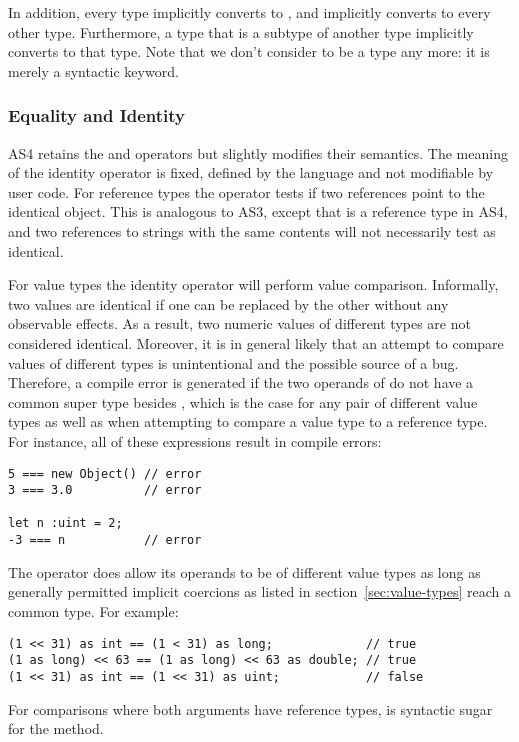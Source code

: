 In addition, every type implicitly converts to \code{*}, and \code{*} implicitly
converts to every other type. Furthermore, a type that is a
subtype of another type implicitly
converts to that type.
Note that we don't consider  to be a type any more: it is merely a
syntactic keyword.


\subsubsection{Equality and Identity}
AS4 retains the \code{==} and \code{===} operators but slightly
modifies their semantics. The meaning of the identity operator
\code{===} is fixed, defined by the language and not modifiable by
user code. For reference types the \code{===} operator tests if two
references point to the identical object. This is analogous to AS3,
except that  is a reference type in AS4, and two
references to strings with the same contents will not
necessarily test as identical.

For value types the identity operator will perform value comparison. Informally,
two values are identical if one can be replaced by the other without any
observable effects. As a result, two numeric values of different types are not
considered identical. Moreover, it is in general likely that an attempt to
compare values of different types is unintentional and the possible source of a
bug. Therefore, a compile error is generated if the two operands of \code{===}
do not have a common super type besides \code{*}, which is the case for any pair
of different value types as well as when attempting to compare a value type to a reference type. For
instance, all of these expressions result in compile errors:

\begin{verbatim}
5 === new Object() // error
3 === 3.0          // error

let n :uint = 2;
-3 === n           // error
\end{verbatim}

The \code{==} operator does allow its operands to be of different value types as
long as generally permitted implicit coercions as listed in section~\ref{sec:value-types}
reach a common type. For example:
\begin{verbatim}
(1 << 31) as int == (1 < 31) as long;             // true
(1 as long) << 63 == (1 as long) << 63 as double; // true
(1 << 31) as int == (1 << 31) as uint;            // false
\end{verbatim}
For comparisons where both arguments have reference types, \code{==} is
syntactic sugar for the  method.

